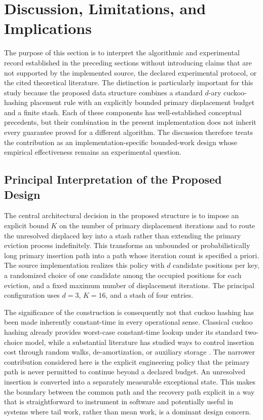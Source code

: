 \documentclass[conference]{IEEEtran}
\begin{document}
\section{Discussion, Limitations, and Implications}
\label{sec:discussion}

The purpose of this section is to interpret the algorithmic and experimental
record established in the preceding sections without introducing claims that
are not supported by the implemented source, the declared experimental
protocol, or the cited theoretical literature. The distinction is particularly
important for this study because the proposed data structure combines a
standard $d$-ary cuckoo-hashing placement rule with an explicitly bounded
primary displacement budget and a finite stash. Each of these components has
well-established conceptual precedents, but their combination in the present
implementation does not inherit every guarantee proved for a different
algorithm. The discussion therefore treats the contribution as an
implementation-specific bounded-work design whose empirical effectiveness
remains an experimental question.

\subsection{Principal Interpretation of the Proposed Design}
\label{subsec:principal_interpretation}

The central architectural decision in the proposed structure is to impose an
explicit bound $K$ on the number of primary displacement iterations and to
route the unresolved displaced key into a stash rather than extending the
primary eviction process indefinitely. This transforms an unbounded or
probabilistically long primary insertion path into a path whose iteration
count is specified a priori. The source implementation realizes this policy
with $d$ candidate positions per key, a randomized choice of one candidate
among the occupied positions for each eviction, and a fixed maximum number
of displacement iterations. The principal configuration uses $d=3$,
$K=16$, and a stash of four entries.

The significance of the construction is consequently not that cuckoo hashing
has been made inherently constant-time in every operational sense. Classical
cuckoo hashing already provides worst-case constant-time lookup under its
standard two-choice model, while a substantial literature has studied ways to
control insertion cost through random walks, de-amortization, or auxiliary
storage \cite{pagh2004cuckoo,arbitman2009deamortized,fountoulakis2010insertion}.
The narrower contribution considered here is the explicit engineering policy
that the primary path is never permitted to continue beyond a declared
budget. An unresolved insertion is converted into a separately measurable
exceptional state. This makes the boundary between the common path and the
recovery path explicit in a way that is straightforward to instrument in
software and potentially useful in systems where tail work, rather than mean
work, is a dominant design concern.
\end{document}
